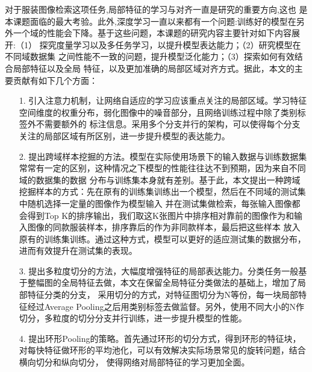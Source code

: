 对于服装图像检索这项任务,局部特征的学习与对齐一直是研究的重要方向,这也
是本课题面临的最大考验。此外,深度学习一直以来都有一个问题:训练好的模型在另
外一个域的性能会下降。基于这些问题，本课题的研究内容主要针对如下内容展开:（1）
探究度量学习以及多任务学习，以提升模型表达能力；（2）研究模型在不同域数据集
之间性能不一致的问题，提升模型泛化能力；（3）探索如何有效结合局部特征以及全局
特征，以及更加准确的局部区域对齐方式。据此，本文的主要贡献有如下几个方面：
\begin{itemize}
  \item [1.] 引入注意力机制，让网络自适应的学习应该重点关注的局部区域。学习特征空间维度的权重分布，弱化图像中的噪音部分，且网络训练过程中除了类别标签外不需要额外的
    标注信息。采用多个分支并行的架构，可以使得每个分支关注的局部区域有所区别，进一步提升模型的表达能力。

  \item [2.] 提出跨域样本挖掘的方法。模型在实际使用场景下的输入数据与训练数据集常常有一定的区别，这种情况之下模型的性能往往达不到预期，因为来自不同域的数据集的数据
    分布与训练集本身就有差别。基于此，本文提出一种跨域挖掘样本的方式：先在原有的训练集训练出一个模型，然后在不同域的测试集中随机选择一定量的图像作为模型输入
    并在测试集做检索，每张输入图像都会得到Top K的排序输出，我们取这K张图片中排序相对靠前的图像作为和输入图像的同款服装样本，排序靠后的作为非同款样本，最后把这些样本
    放入原有的训练集训练。通过这种方式，模型可以更好的适应测试集的数据分布，进而有效提升在测试集的表现。
  
  \item [3.] 提出多粒度切分的方法，大幅度增强特征的局部表达能力。分类任务一般基于整幅图的全局特征去做，本文在保留全局特征分类做法的基础上，增加了局部特征分类的分支，
    采用切分的方式，对特征图切分为N等份，每一块局部特征经过Average Pooling之后用类别标签去做监督。另外，使用不同大小的N作切分，多粒度的切分分支并行训练，进一步提升模型的性能。

  \item [4.] 提出环形Pooling的策略。首先通过环形的切分方式，得到环形的特征块，对每快特征做环形的平均池化，可以有效解决实际场景常见的旋转问题，结合横向切分和纵向切分，
    使得网络对局部特征的学习更加全面。

\end{itemize}

